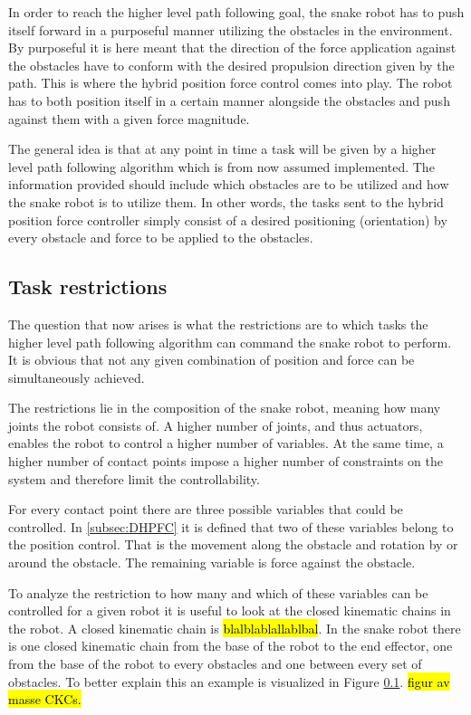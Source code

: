 In order to reach the higher level path following goal, the snake robot has to push itself forward in a purposeful manner utilizing the obstacles in the environment. By purposeful it is here meant that the direction of the force application against the obstacles have to conform with the desired propulsion direction given by the path. This is where the hybrid position force control comes into play. The robot has to both position itself in a certain manner alongside the obstacles and push against them with a given force magnitude.

The general idea is that at any point in time a task will be given by a higher level path following algorithm which is from now assumed implemented. The information provided should include which obstacles are to be utilized and how the snake robot is to utilize them. In other words, the tasks sent to the hybrid position force controller simply consist of a desired positioning (orientation) by every obstacle and force to be applied to the obstacles.



\subsection{Task restrictions}

The question that now arises is what the restrictions are to which tasks the higher level path following algorithm can command the snake robot to perform. It is obvious that not any given combination of position and force can be simultaneously achieved.

The restrictions lie in the composition of the snake robot, meaning how many joints the robot consists of. A higher number of joints, and thus actuators, enables the robot to control a higher number of variables. At the same time, a higher number of contact points impose a higher number of constraints on the system and therefore limit the controllability.

For every contact point there are three possible variables that could be controlled. In \ref{subsec:DHPFC} it is defined that two of these variables belong to the position control. That is the movement along the obstacle and rotation by or around the obstacle. The remaining variable is force against the obstacle.

To analyze the restriction to how many and which of these variables can be controlled for a given robot it is useful to look at the closed kinematic chains in the robot. A closed kinematic chain is \hl{blalblablallablbal}. In the snake robot there is one closed kinematic chain from the base of the robot to the end effector, one from the base of the robot to every obstacles and one between every set of obstacles. To better explain this an example is visualized in Figure \ref{}. \hl{figur av masse CKCs.}

